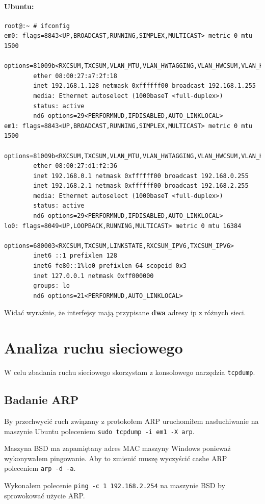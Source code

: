 \documentclass{mwart} %
\begin{document}
\paragraph{Ubuntu:}
\begin{verbatim}
root@:~ # ifconfig  
em0: flags=8843<UP,BROADCAST,RUNNING,SIMPLEX,MULTICAST> metric 0 mtu 1500 
        options=81009b<RXCSUM,TXCSUM,VLAN_MTU,VLAN_HWTAGGING,VLAN_HWCSUM,VLAN_HWFILTER>
        ether 08:00:27:a7:2f:18
        inet 192.168.1.128 netmask 0xffffff00 broadcast 192.168.1.255
        media: Ethernet autoselect (1000baseT <full-duplex>)
        status: active
        nd6 options=29<PERFORMNUD,IFDISABLED,AUTO_LINKLOCAL>
em1: flags=8843<UP,BROADCAST,RUNNING,SIMPLEX,MULTICAST> metric 0 mtu 1500
        options=81009b<RXCSUM,TXCSUM,VLAN_MTU,VLAN_HWTAGGING,VLAN_HWCSUM,VLAN_HWFILTER>
        ether 08:00:27:d1:f2:36
        inet 192.168.0.1 netmask 0xffffff00 broadcast 192.168.0.255
        inet 192.168.2.1 netmask 0xffffff00 broadcast 192.168.2.255
        media: Ethernet autoselect (1000baseT <full-duplex>)
        status: active
        nd6 options=29<PERFORMNUD,IFDISABLED,AUTO_LINKLOCAL>
lo0: flags=8049<UP,LOOPBACK,RUNNING,MULTICAST> metric 0 mtu 16384
        options=680003<RXCSUM,TXCSUM,LINKSTATE,RXCSUM_IPV6,TXCSUM_IPV6>
        inet6 ::1 prefixlen 128
        inet6 fe80::1%lo0 prefixlen 64 scopeid 0x3
        inet 127.0.0.1 netmask 0xff000000
        groups: lo
        nd6 options=21<PERFORMNUD,AUTO_LINKLOCAL>
\end{verbatim}

Widać wyraźnie, że interfejsy mają przypisane \textbf{dwa} adresy ip z różnych sieci.

\section{Analiza ruchu sieciowego}
W celu zbadania ruchu sieciowego skorzystam z konsolowego narzędzia \texttt{tcpdump}.

\subsection{Badanie ARP}
By przechwycić ruch związany z protokołem ARP uruchomiłem nasłuchiwanie na maszynie Ubuntu poleceniem \texttt{sudo tcpdump -i em1 -X arp}.

Maszyna BSD ma zapamiętany adres MAC maszyny Windows ponieważ wykonywałem pingowanie. Aby to zmienić muszę wyczyścić cashe ARP poleceniem \texttt{arp -d -a}.

Wykonałem polecenie \texttt{ping -c 1 192.168.2.254} na maszynie BSD by sprowokować użycie ARP.
\end{document}
